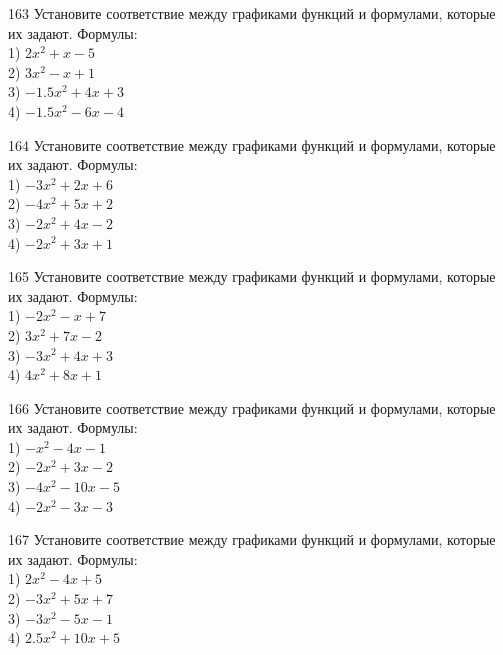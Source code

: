 \documentclass[4apaper]{article}
\begin{document}
\begin{taskBN}{163}
Установите соответствие между графиками функций и формулами, которые их задают. Формулы: \\1) $2x^2+x-5$\\2) $3x^2-x+1$\\3) $-1.5x^2+4x+3$\\4) $-1.5x^2-6x-4$
\end{taskBN}

\begin{taskBN}{164}
Установите соответствие между графиками функций и формулами, которые их задают. Формулы: \\1) $-3x^2+2x+6$\\2) $-4x^2+5x+2$\\3) $-2x^2+4x-2$\\4) $-2x^2+3x+1$
\end{taskBN}

\begin{taskBN}{165}
Установите соответствие между графиками функций и формулами, которые их задают. Формулы: \\1) $-2x^2-x+7$\\2) $3x^2+7x-2$\\3) $-3x^2+4x+3$\\4) $4x^2+8x+1$
\end{taskBN}

\begin{taskBN}{166}
Установите соответствие между графиками функций и формулами, которые их задают. Формулы: \\1) $-x^2-4x-1$\\2) $-2x^2+3x-2$\\3) $-4x^2-10x-5$\\4) $-2x^2-3x-3$
\end{taskBN}

\begin{taskBN}{167}
Установите соответствие между графиками функций и формулами, которые их задают. Формулы: \\1) $2x^2-4x+5$\\2) $-3x^2+5x+7$\\3) $-3x^2-5x-1$\\4) $2.5x^2+10x+5$
\end{taskBN}
\end{document}
